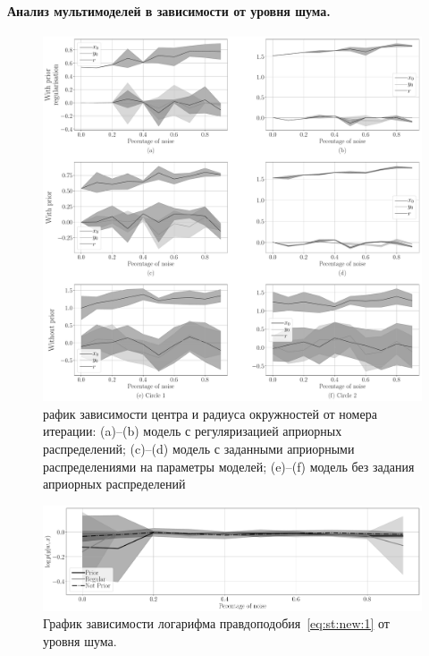 \paragraph{Анализ мультимоделей в зависимости от уровня шума.} 
\begin{figure}[h!t]\center
\includegraphics[width=1\textwidth]{results/priorexpert/experiment_synthetic_param_progress_noise}
\caption{рафик зависимости центра и радиуса окружностей от номера итерации: (a)--(b) модель с регуляризацией априорных распределений; (c)--(d) модель с заданными априорными распределениями на параметры моделей; (e)--(f) модель без задания априорных распределений}
\label{experiment:st:3:1}
\end{figure}

\begin{figure}[h!t]\center
\includegraphics[width=1\textwidth]{results/priorexpert/experiment_synt_likelihood_progress_noise}
\caption{График зависимости логарифма правдоподобия~\eqref{eq:st:new:1} от уровня шума.}
\label{experiment:st:3:2}
\end{figure}

